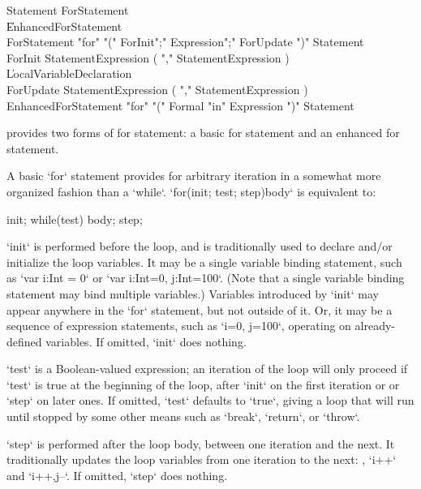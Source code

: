 \begin{grammar}
Statement \: ForStatement \\
          \| EnhancedForStatement \\
ForStatement \: \xcd"for" \xcd"("
        ForInit\opt \xcd";" Expression\opt \xcd";" ForUpdate\opt
        \xcd")" Statement \\
ForInit \:
        StatementExpression ( \xcd"," StatementExpression )\star
        \\
      \| LocalVariableDeclaration \\
ForUpdate \:
        StatementExpression ( \xcd"," StatementExpression )\star\\
EnhancedForStatement \: \xcd"for" \xcd"("
        Formal \xcd"in" Expression 
        \xcd")" Statement \\
\end{grammar}

\Xten{} provides two forms of for statement: a basic for
statement and an enhanced for statement.

A basic \xcd`for` statement provides for arbitrary iteration in a somewhat
more organized fashion than a \xcd`while`.  \xcd`for(init; test; step)body` is
equivalent to: 
\begin{xten}
{
   init;
   while(test) {
      body;
      step;
   }
}
\end{xten}

\xcd`init` is performed before the loop, and is traditionally used to declare
and/or initialize the loop variables. It may be a single variable binding
statement, such as \xcd`var i:Int = 0` or \xcd`var i:Int=0, j:Int=100`. (Note
that a single variable binding statement may bind multiple variables.)
Variables introduced by \xcd`init` may appear anywhere in the \xcd`for`
statement, but not outside of it.  Or, it may be a sequence of expression
statements, such as \xcd`i=0, j=100`, operating on already-defined variables.
If omitted, \xcd`init` does nothing.

\xcd`test` is a Boolean-valued expression; an iteration of the loop will only
proceed if \xcd`test` is true at the beginning of the loop, after \xcd`init`
on the first iteration or or \xcd`step` on later ones. If omitted, \xcd`test`
defaults to \xcd`true`, giving a loop that will run until stopped by some
other means such as \xcd`break`, \xcd`return`, or \xcd`throw`.

\xcd`step` is performed after the loop body, between one iteration and the
next. It traditionally updates the loop variables from one iteration to the
next: \eg, \xcd`i++` and \xcd`i++,j--`.  If omitted, \xcd`step` does nothing.

